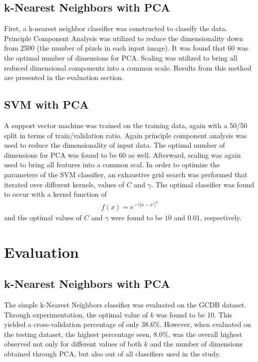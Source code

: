\documentclass[10pt,twocolumn,letterpaper]{article}
\begin{document}
\subsection{k-Nearest Neighbors with PCA}

First, a k-nearest neighbor classifier was constructed to classify the data. Principle Component Analysis was utilized to reduce the dimensionality down from 2500 (the number of pixels in each input image). It was found that $60$ was the optimal number of dimensions for PCA. Scaling was utilized to bring all reduced dimensional components into a common scale. Results from this method are presented in the evaluation section.

\subsection{SVM with PCA}

A support vector machine was trained on the training data, again with a 50/50 split in terms of train/validation ratio. Again principle component analysis was used to reduce the dimensionality of input data. The optimal number of dimensions for PCA was found to be $60$ as well. Afterward, scaling was again used to bring all features into a common scal. In order to optimize the parameters of the SVM classifier, an exhaustive grid search was performed that iterated over different kernels, values of $C$ and $\gamma$. The optimal classifier was found to occur with a kernel function of
\begin{align*}
    f(x) = e^{-\gamma \left| x - x' \right|^2}
\end{align*}
and the optimal values of $C$ and $\gamma$ were found to be $10$ and $0.01$, respectively.

\section{Evaluation}
\subsection{k-Nearest Neighbors with PCA}

The simple k-Nearest Neighbors classifier was evaluated on the GCDB dataset. Through experimentation, the optimal value of $k$ was found to be 10. This yielded a cross-validation percentage of only $38.6\%$. However, when evaluated on the testing dataset, the highest percentage seen, $8.0\%$, was the overall highest observed not only for different values of both $k$ and the number of dimensions obtained through PCA, but also out of all classifiers used in the study.
\end{document}
